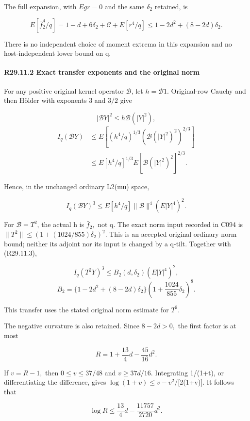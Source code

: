 The full expansion, with \(Egr=0\) and the same \(\delta_2\) retained, is

\[
E[\bar f_2^4/q]
=1-d+6\delta_2+\mathcal C+E[r^4/q]
\le1-2d^2+(8-2d)\delta_2.
\tag{R29.11.3}\label{eq:unit-output:inverse-row}
\]

There is no independent choice of moment extrema in this expansion
and no host-independent lower bound on q.

\paragraph{R29.11.2 Exact transfer exponents and the original norm}

For any positive original kernel operator \(\mathcal B\), let
\(h= \mathcal B1\). Original-row Cauchy and then Hölder with
exponents 3 and \(3/2\) give

\[
|\mathcal BY|^2\le h\mathcal B(|Y|^2),
\]
\[
\begin{aligned}
I_q(\mathcal BY)
&\le E[(h^4/q)^{1/3}
       (\mathcal B(|Y|^2)^2)^{2/3}]\\
&\le E[h^4/q]^{1/3}
       E[\mathcal B(|Y|^2)^2]^{2/3}.
\end{aligned}
\]

Hence, in the unchanged ordinary L2(mu) space,

\[
I_q(\mathcal BY)^3
\le E[h^4/q]\|\mathcal B\|^4(E|Y|^4)^2.
\tag{R29.11.4}\label{eq:unit-output:ordinary-transfer}
\]

For \(\mathcal B=T^2\), the actual h is \(\bar f_2,\allowbreak \) not q.
The exact norm input recorded in C094 is
\(\|T^2\|\le(1+(1024/855)\delta_2)^2\).
This is an accepted original ordinary norm bound; neither its
adjoint nor its input is changed by a q-tilt. Together with (R29.11.3),

\[
I_q(T^2Y)^3\le B_2(d,\delta_2)(E|Y|^4)^2,
\]
\[
B_2=\{1-2d^2+(8-2d)\delta_2\}
\left(1+\frac{1024}{855}\delta_2\right)^8.
\tag{R29.11.5}
\]

This transfer uses the stated original norm estimate for $T^2$.

The negative curvature is also retained. Since
\(8-2d>0,\allowbreak \) the first factor is at most

\[
R=1+\frac{13}{4}d-\frac{45}{16}d^2.
\]

If \(v=R-1,\allowbreak \) then \(0\le v\le 37/48\) and \(v\ge 37d/16.\) Integrating
1/(1+t), or differentiating the difference, gives
\(\log(1+v)\le v-v^2/\)[2(1+v)]. It follows that

\[
\log R\le\frac{13}{4}d-\frac{11757}{2720}d^2.
\]

